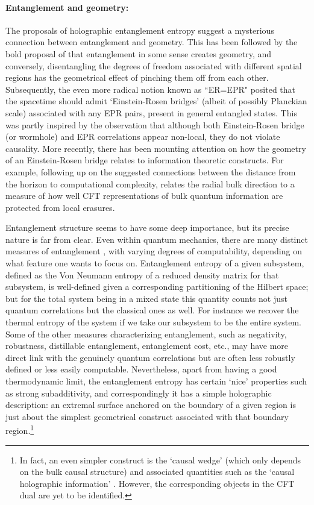 \documentclass[12pt]{article}
\begin{document}
\paragraph{Entanglement and geometry:}  %
The proposals of holographic entanglement entropy \cite{Ryu:2006bv,Hubeny:2007xt} suggest a mysterious connection between entanglement and geometry.  This has been followed by 
the bold proposal of \cite{Swingle:2009bg,VanRaamsdonk:2009ar,VanRaamsdonk:2010pw} that entanglement in some sense creates geometry, and conversely, disentangling the degrees of freedom associated with different spatial regions has the geometrical effect of pinching them off from each other.  Subsequently, the even more radical notion known as ``ER=EPR"  \cite{Maldacena:2013xja} posited that the spacetime should admit `Einstein-Rosen bridges' (albeit of possibly Planckian scale) associated with any EPR pairs, present in general entangled states.  This was partly inspired by the observation that although both Einstein-Rosen bridge (or wormhole) and EPR correlations appear non-local, they do not violate causality. 
More recently, there has been mounting attention on how the geometry of an Einstein-Rosen bridge relates to information theoretic constructs.  For example, following up on the suggested connections \cite{Susskind:2013aaa} between the distance from the horizon to computational complexity, 
 \cite{Almheiri:2014lwa} relates the radial bulk direction to a measure of how well CFT representations of bulk quantum information are protected from local erasures. 

Entanglement structure seems to have some deep importance, but its precise nature is far from clear.  Even within quantum mechanics, there are many distinct measures of entanglement \cite{Vidal:2002zz,Horodecki:2009zz}, with varying degrees of computability, depending on what feature one wants to focus on.
Entanglement entropy of a given subsystem, defined as the Von Neumann entropy of a reduced density matrix for that subsystem, is well-defined given a corresponding partitioning of the Hilbert space; but for the total system being in a mixed state this quantity counts not just quantum correlations but the classical ones as well.  For instance we recover the thermal entropy of the system if we take our subsystem to be the entire system.  
Some of the other measures characterizing entanglement, such as negativity, robustness, distillable entanglement, entanglement cost, etc., may have more direct link with the genuinely quantum correlations but are often less robustly defined or less easily computable.  Nevertheless, apart from having a good thermodynamic limit, the entanglement entropy has certain `nice' properties such as strong subadditivity, and correspondingly it has a simple holographic description: an extremal surface anchored on the boundary of a given region is just about the simplest geometrical construct associated with that boundary region.\footnote{
In fact, an even simpler construct is the `causal wedge' (which only depends on the bulk causal structure) and associated quantities such as the `causal holographic information' \cite{Hubeny:2012wa}.   
However, the corresponding objects in the CFT dual are yet to be identified.
}
\end{document}
